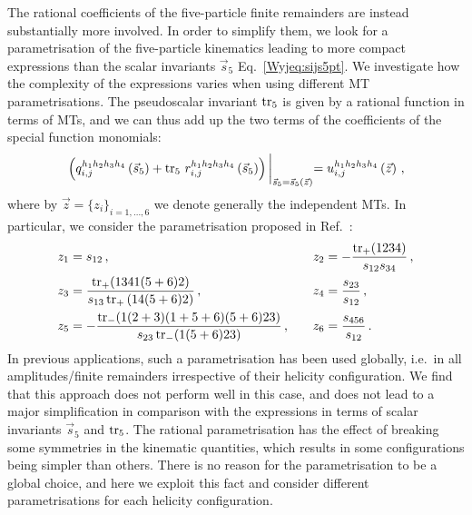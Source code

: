 \documentclass[main.tex]{subfiles}
\begin{document}
The rational coefficients of the five-particle finite remainders are instead substantially more involved. In order to simplify them, we look for a parametrisation of the five-particle kinematics leading to more compact expressions than the scalar invariants $\vec{s}_5$ Eq.~\ref{Wyjeq:sijs5pt}. We investigate how the complexity of the expressions varies when using different MT parametrisations. The pseudoscalar invariant $\operatorname{\rm tr}_5$ is given by a rational function in terms of MTs, and we can thus add up the two terms of the coefficients of the special function monomials:
\begin{align}
\left( q_{i,j}^{h_1h_2h_3h_4}\left(\vec{s}_5\right) + \operatorname{\rm tr}_5 \, r_{i,j}^{h_1h_2h_3h_4}\left(\vec{s}_5\right) \right) \biggl|_{\vec{s}_5 = \vec{s}_5(\vec{z})} = u_{i,j}^{h_1h_2h_3h_4}\left(\vec{z}\right) \,,
\end{align}
where by $\vec{z} = \{z_i \}_{i=1,\ldots,6}$ we denote generally the independent MTs. In particular, we consider the parametrisation proposed in Ref.~\cite{Badger:2021ega}:
\begin{equation}
\begin{alignedat}{2}
  & z_1 = s_{12} \,, \qquad && z_2 = -\frac{\operatorname{\rm tr}_+(1234)}{s_{12}s_{34}} \,, \\
  & z_3 = \frac{\operatorname{\rm tr}_+(1341(5+6)2)}{s_{13}\operatorname{\rm tr}_+{(14(5+6)2)}} \,, \qquad && z_4 = \frac{s_{23}}{s_{12}} \,, \\
  & z_5 = -\frac{\operatorname{\rm tr}_-(1(2+3)(1+5+6)(5+6)23)}{s_{23}\operatorname{\rm tr}_-(1(5+6)23)} \,, \qquad && z_6 = \frac{s_{456}}{s_{12}} \,.
\end{alignedat}
\label{Wyjeq:mtvardefs5pt}
\end{equation}
In previous applications, such a parametrisation has been used globally, i.e.\ in all amplitudes/finite remainders
irrespective of their helicity configuration. We find that this approach does not perform well in
this case, and does not lead to a major simplification in comparison with the expressions in terms of scalar invariants $\vec{s}_5$ and $\operatorname{\rm tr}_5$. 
The rational parametrisation has the effect of breaking some symmetries in the kinematic quantities,
which results in some configurations being simpler than others. There is no reason for the parametrisation
to be a global choice, and here we exploit this fact and consider different parametrisations for each helicity configuration.
\end{document}
